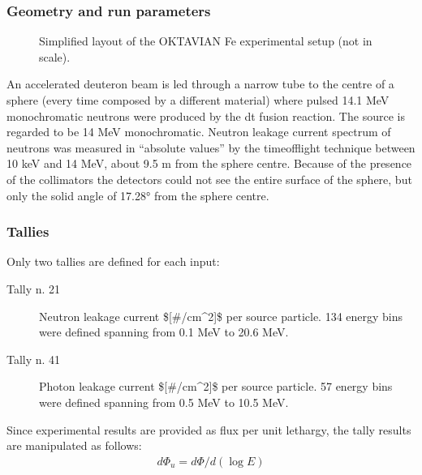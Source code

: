 \documentclass[letterpaper,10pt,english]{sphinxmanual}
\let\sphinxpxdimen\pdfpxdimen\else\newdimen\sphinxpxdimen
\begin{document}
\subsubsection{Geometry and run parameters}
\label{\detokenize{usage/benchmarks:id12}}
\begin{figure}[htbp]
\centering
\capstart

\noindent\sphinxincludegraphics[width=600\sphinxpxdimen]{{oktaviansimplified}.png}
\caption{Simplified layout of the OKTAVIAN Fe experimental setup (not in scale).}\label{\detokenize{usage/benchmarks:id31}}\end{figure}

An accelerated deuteron beam is led through a narrow tube to the centre of a sphere
(every time composed by a different material) where pulsed 14.1 MeV monochromatic
neutrons were produced by the d\sphinxhyphen{}t fusion reaction. The source is regarded to be 14
MeV monochromatic. Neutron leakage current spectrum of neutrons was measured in
“absolute values” by the time\sphinxhyphen{}of\sphinxhyphen{}flight technique between 10 keV and 14 MeV, about
9.5 m from the sphere centre. Because of the presence of the collimators the
detectors could not see the entire surface of the sphere, but only the solid angle
of 17.28° from the sphere centre.


\subsubsection{Tallies}
\label{\detokenize{usage/benchmarks:id13}}
Only two tallies are defined for each input:
\begin{description}
\item[{Tally n. 21}] \leavevmode
Neutron leakage current \${[}\#/cm\textasciicircum{}2{]}\$ per source particle. 134 energy bins were defined spanning from 0.1 MeV to 20.6 MeV.

\item[{Tally n. 41}] \leavevmode
Photon leakage current \${[}\#/cm\textasciicircum{}2{]}\$ per source particle. 57 energy bins were defined spanning from 0.5 MeV to 10.5 MeV.

\end{description}

Since experimental results are provided as flux per unit lethargy, the tally results are manipulated as follows:
\begin{equation*}
\begin{split}d\Phi_u = d\Phi/d(\log{E})\end{split}
\end{equation*}
\end{document}

